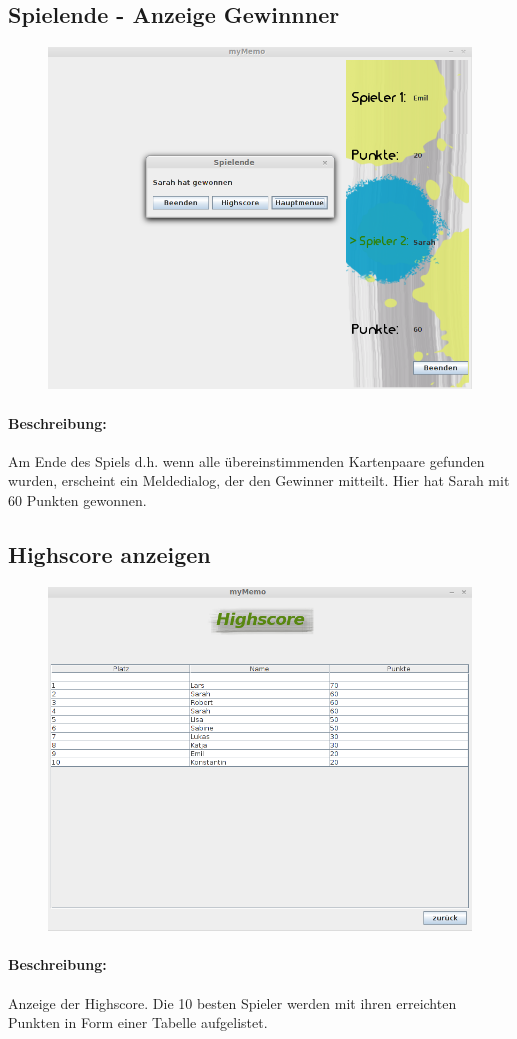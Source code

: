 \subsection{Spielende - Anzeige Gewinnner}
\begin{figure}[!h]
	\centering
    \includegraphics[width=\textwidth]{./guiSpielende.png}
	\label{}
\end{figure}
\paragraph{Beschreibung: }Am Ende des Spiels d.h. wenn alle übereinstimmenden Kartenpaare gefunden wurden, erscheint ein Meldedialog, der den Gewinner mitteilt. Hier hat Sarah mit 60 Punkten gewonnen.


\clearpage
\subsection{Highscore anzeigen}
\begin{figure}[!h]
	\centering
    \includegraphics[width=\textwidth]{./guiHighscore.png}
	\label{}
\end{figure}
\paragraph{Beschreibung: } Anzeige der Highscore. Die 10 besten Spieler werden mit ihren erreichten Punkten in Form einer Tabelle aufgelistet.

